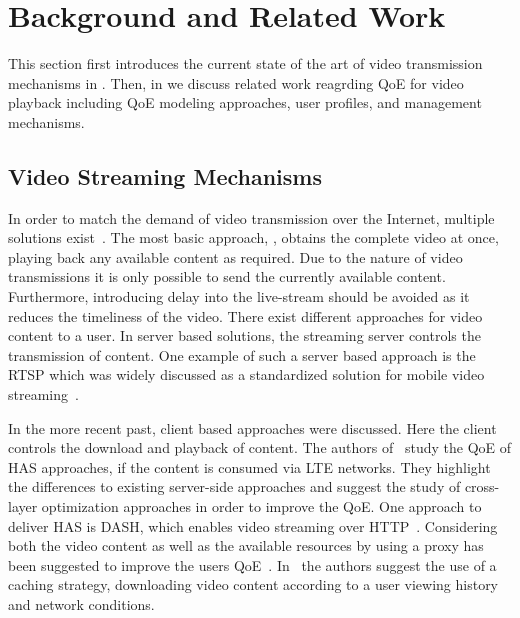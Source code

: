 \section{Background and Related Work}\label{sec:application:background}
This section first introduces the current state of the art of video transmission mechanisms in .
Then, in  we discuss related work reagrding 
\gls{QoE} for video playback including \gls{QoE} modeling approaches, user profiles, and management mechanisms.

\subsection{Video Streaming Mechanisms}\label{sec:application:background:video_streaming_mechanisms}
In order to match the demand of video transmission over the Internet, multiple solutions exist~\cite{Begen2011}.
The most basic approach, \emph{\download}, obtains the complete video at once, playing back any available content as required.
Due to the nature of \emph{\live} video transmissions it is only possible to send the currently available content.
Furthermore, introducing delay into the live-stream should be avoided as it reduces the timeliness of the video.
There exist different approaches for \emph{\streaming} video content to a user.
In server based solutions, the streaming server controls the transmission of content.
One example of such a server based approach is the \gls{RTSP} which was widely discussed as a standardized solution for mobile video streaming~\cite{Elsen2001}.

In the more recent past, client based approaches were discussed.
Here the client controls the download and playback of content.
The authors of~\cite{Oyman2012} study the \gls{QoE} of \gls{HAS} approaches, if the content is consumed via \gls{LTE} networks.
They highlight the differences to existing server-side approaches and suggest the study of cross-layer optimization approaches in order to improve the \gls{QoE}.
One approach to deliver \gls{HAS} is \gls{DASH}, which enables video streaming over \gls{HTTP}~\cite{Sodagar2011}.
Considering both the video content as well as the available resources by using a proxy has been suggested to improve the users \gls{QoE}~\cite{Essaili2013}.
In~\cite{Xin2012} the authors suggest the use of a caching strategy, downloading video content according to a user viewing history and network conditions.

